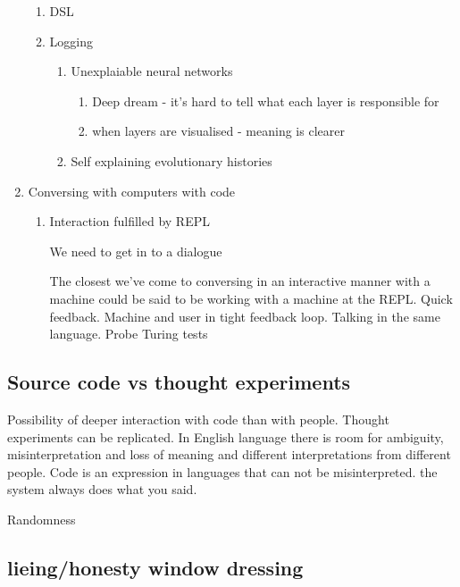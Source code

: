\documentclass[11pt]{article}
\begin{document}
\begin{enumerate}
\begin{enumerate}
\item DSL
\label{sec:org4368f44}

\item Logging
\label{sec:orgb3bd5ec}
\begin{enumerate}
\item Unexplaiable neural networks
\label{sec:orgfe166d0}
\begin{enumerate}
\item Deep dream - it's hard to tell what each layer is responsible for
\label{sec:orgb411717}
\item when layers are visualised - meaning is clearer
\label{sec:orge0b4d90}
\end{enumerate}

\item Self explaining evolutionary histories
\label{sec:org1518ab4}
\end{enumerate}
\end{enumerate}

\item Conversing with computers with code
\label{sec:org086a190}
\begin{enumerate}
\item Interaction fulfilled by REPL
\label{sec:org24c8cae}

We need to get in to a dialogue

The closest we've come to conversing in an interactive manner with a machine could be said to be working with a machine at the REPL.
Quick feedback. 
Machine and user in tight feedback loop. 
Talking in the same language.
Probe
Turing tests
\end{enumerate}
\end{enumerate}


\subsection{Source code vs thought experiments}
\label{sec:org5868386}
Possibility of deeper interaction with code than with people.
Thought experiments can be replicated.
In English language there is room for ambiguity, misinterpretation and loss of meaning and different interpretations from different people.
Code is an expression in languages that can not be misinterpreted. the system always does what you said.

Randomness

\subsection{lieing/honesty window dressing}
\label{sec:org7359448}
\end{document}
